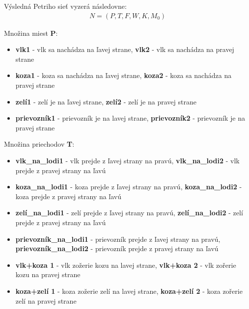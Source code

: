 \documentclass[11pt,a4paper]{article}
\begin{document}
Výsledná Petriho sieť vyzerá následovne\cite{AA}: \\
\begin{align*}
    N = (P, T, F, W, K, M_0)
\end{align*}

Množina miest \textbf{P}:
\begin{itemize}
    \item \textbf{vlk1} - vlk sa nachádza na ľavej strane, \textbf{vlk2} - vlk sa nachádza na pravej strane
    \item \textbf{koza1} - koza sa nachádza na ľavej strane, \textbf{koza2} - koza sa nachádza na pravej strane
    \item \textbf{zelí1} - zelí je na ľavej strane, \textbf{zelí2} - zelí je na pravej strane
    \item \textbf{prievozník1} - prievozník je na lavej strane, \textbf{prievozník2} - prievozník je na pravej strane
\end{itemize}

Množina priechodov \textbf{T}:
\begin{itemize}
    \item \textbf{vlk\_na\_lodi1} - vlk prejde z ľavej strany na pravú, \textbf{vlk\_na\_lodi2} - vlk prejde z pravej strany na ľavú
    \item \textbf{koza\_na\_lodi1} - koza prejde z ľavej strany na pravú, \textbf{koza\_na\_lodi2} - koza prejde z pravej strany na ľavú
    \item \textbf{zelí\_na\_lodi1} - zelí prejde z ľavej strany na pravú, \textbf{zelí\_na\_lodi2} - zelí prejde z pravej strany na ľavú
    \item \textbf{prievozník\_na\_lodi1} - prievozník prejde z ľavej strany na pravú, \textbf{prievozník\_na\_lodi2} - prievozník prejde z pravej strany na ľavú
    \item \textbf{vlk+koza 1} - vlk zožerie kozu na lavej strane, \textbf{vlk+koza 2} - vlk zořerie kozu na pravej strane
    \item \textbf{koza+zelí 1} - koza zožerie zelí na lavej strane, \textbf{koza+zelí 2} - koza zořerie zelí na pravej strane
\end{itemize}

\newcommand{\Cross}{\mathbin{\tikz [x=1.4ex,y=1.4ex,line width=.2ex] \draw (0,0) -- (1,1) (0,1) -- (1,0);}}
\end{document}
